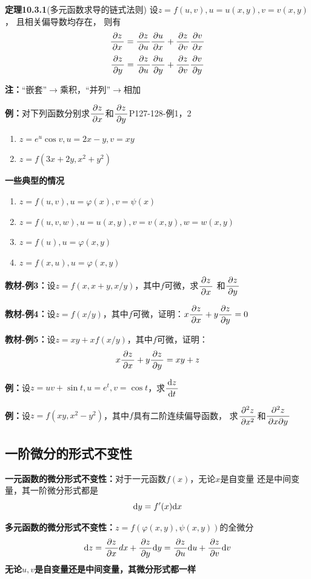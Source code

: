 {\bf 定理10.3.1}(多元函数求导的链式法则)
设$z=f(u,v),u=u(x,y),v=v(x,y)$， 且相关偏导数均存在， 则有
$${\df{\p z}{\p x}=\df{\p z}{\p u}\df{\p u}{\p x}
+\df{\p z}{\p v}\df{\p v}{\p x}}$$
$${\df{\p z}{\p y}=\df{\p z}{\p u}\df{\p u}{\p y}
+\df{\p z}{\p v}\df{\p v}{\p y}}$$

{\bf 注：}“嵌套”$\to$乘积，“并列”$\to$相加

{\bf 例：}对下列函数分别求$\df{\p z}{\p x}$和$\df{\p z}{\p y}$\hfill P127-128-例1，2
\begin{enumerate}[(1)]
  \setlength{\itemindent}{1cm}
  \item $z=e^u\cos v,u=2x-y,v=xy$
  \item $z=f(3x+2y,x^2+y^2)$
\end{enumerate}

\begin{shaded}
	{\bf 一些典型的情况}
	
	\begin{enumerate}[(1)]
  	  \setlength{\itemindent}{1cm}
	  \item $z=f(u,v),u=\varphi(x),v=\psi(x)$ 
	  \item $z=f(u,v,w),u=u(x,y),v=v(x,y),w=w(x,y)$ 
	  \item $z=f(u),u=\varphi(x,y)$ 
	  \item $z=f(x,u),u=\varphi(x,y)$
	\end{enumerate}
\end{shaded}

{\bf 教材-例3：}设$z=f(x,x+y,x/y)$，其中$f$可微，求$\df{\p z}{\p x}$
和$\df{\p z}{\p y}$

{\bf 教材-例4：}设$z=f(x/y)$，其中$f$可微，证明：$x\df{\p z}{\p x}+y
\df{\p z}{\p y}=0$

{\bf 教材-例5：}设$z=xy+xf(x/y)$，其中$f$可微，证明：
$$x\df{\p z}{\p x}+y\df{\p z}{\p y}=xy+z$$

{\bf 例：}设$z=uv+\sin t,u=e^t,v=\cos t$，求$\df{\d z}{\d t}$

{\bf 例：}设$z=f(xy,x^2-y^2)$，其中$f$具有二阶连续偏导函数，
求$\df{\p^2 z}{\p x^2}$和$\df{\p^2 z}{\p x\p y}$

\subsection{一阶微分的形式不变性}

{\bf 一元函数的微分形式不变性：}对于一元函数$f(x)$，无论$x$是自变量
还是中间变量，其一阶微分形式都是
$$\d y=f'(x)\d x$$

{\bf 多元函数的微分形式不变性：}$z=f(\varphi(x,y),\psi(x,y))$的全微分
$${\d z=\df{\p z}{\p x}dx+\df{\p z}{\p y}\d y
=\df{\p z}{\p u}\d u+\df{\p z}{\p v}\d v}$$
{\bf 无论$u,v$是自变量还是中间变量，其微分形式都一样}

